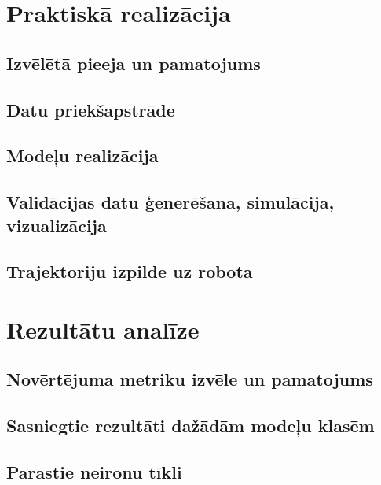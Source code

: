 \documentclass[12pt, a4paper]{article}
\numberwithin{equation}{section} %
\begin{document}
\newpage
\section{Praktiskā realizācija}

\subsection{Izvēlētā pieeja un pamatojums}

\subsection{Datu priekšapstrāde}

\subsection{Modeļu realizācija}

\subsection{Validācijas datu ģenerēšana, simulācija, vizualizācija}

\subsection{Trajektoriju izpilde uz robota}


%
%
%
%
%
%
%
%
%
%
%
%
%
%
%
%
%
%
%

\newpage
\section{Rezultātu analīze}

\subsection{Novērtējuma metriku izvēle un pamatojums}

\subsection{Sasniegtie rezultāti dažādām modeļu klasēm}

\subsection{Parastie neironu tīkli}
\end{document}

